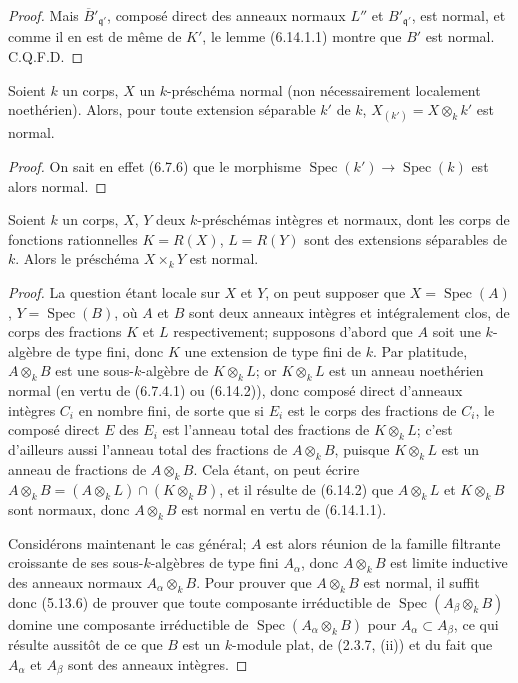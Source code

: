 \begin{proof}
Mais $\overline{B}'_{\mathfrak q'}$, composé direct des anneaux normaux
$L''$ et $B'_{\mathfrak q'}$, est normal, et comme il en est de même de
$K'$, le lemme (6.14.1.1) montre que $B'$ est normal. C.Q.F.D.
\end{proof}

\begin{corollary}[6.14.2]
\label{IV.2.s6.14.2-fr}
Soient $k$ un corps, $X$ un $k$-préschéma normal \textup{(non nécessairement
localement noethérien)}. Alors, pour toute extension séparable $k'$ de $k$,
$X_{(k')}=X\otimes_k k'$ est normal.
\end{corollary}

\begin{proof}
On sait en effet (6.7.6) que le morphisme
$\operatorname{Spec}(k')\to\operatorname{Spec}(k)$ est alors normal.
\end{proof}

\begin{corollary}[6.14.3]
\label{IV.2.s6.14.3-fr}
Soient $k$ un corps, $X$, $Y$ deux $k$-préschémas intègres et normaux, dont
les corps de fonctions rationnelles $K=R(X)$, $L=R(Y)$ sont des extensions
séparables de $k$. Alors le préschéma $X\times_k Y$ est normal.
\end{corollary}

\begin{proof}
La question étant locale sur $X$ et $Y$, on peut supposer que
$X=\operatorname{Spec}(A)$, $Y=\operatorname{Spec}(B)$, où $A$ et $B$ sont
deux anneaux intègres et intégralement clos, de corps des fractions $K$ et
$L$ respectivement; supposons d'abord que $A$ soit une $k$-algèbre de type
fini, donc $K$ une extension de type fini de $k$. Par platitude,
$A\otimes_k B$ est une sous-$k$-algèbre de $K\otimes_k L$; or
$K\otimes_k L$ est un anneau noethérien normal (en vertu de (6.7.4.1) ou
(6.14.2)), donc composé direct d'anneaux intègres $C_i$ en nombre fini, de
sorte que si $E_i$ est le corps des fractions de $C_i$, le composé direct
$E$ des $E_i$ est l'anneau total des fractions de $K\otimes_k L$; c'est
d'ailleurs aussi l'anneau total des fractions de $A\otimes_k B$, puisque
$K\otimes_k L$ est un anneau de fractions de $A\otimes_k B$. Cela étant,
on peut écrire
$A\otimes_k B=(A\otimes_k L)\cap(K\otimes_k B)$, et il résulte de (6.14.2)
que $A\otimes_k L$ et $K\otimes_k B$ sont normaux, donc $A\otimes_k B$ est
normal en vertu de (6.14.1.1).

Considérons maintenant le cas général; $A$ est alors réunion de la famille
filtrante croissante de ses sous-$k$-algèbres de type fini $A_\alpha$,
donc $A\otimes_k B$ est limite inductive des anneaux normaux
$A_\alpha\otimes_k B$. Pour prouver que $A\otimes_k B$ est normal, il
suffit donc (5.13.6) de prouver que toute composante irréductible de
$\operatorname{Spec}(A_\beta\otimes_k B)$ domine une composante
irréductible de $\operatorname{Spec}(A_\alpha\otimes_k B)$ pour
$A_\alpha\subset A_\beta$, ce qui résulte aussitôt de ce que $B$ est un
$k$-module plat, de (2.3.7, (ii)) et du fait que $A_\alpha$ et $A_\beta$
sont des anneaux intègres.
\end{proof}

